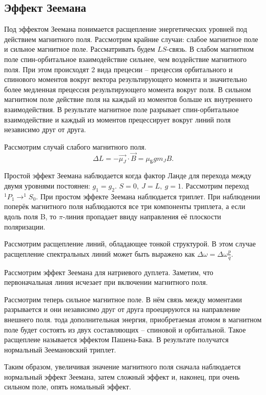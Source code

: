 \subsection{Эффект Зеемана}
Под эффектом Зеемана понимается расщепление энергетических уровней под действием магнитного поля. Рассмотрим крайние случаи: слабое магнитное поле и сильное магнитное поле. Рассматривать будем \( LS \)-связь. В слабом магнитном поле спин-орбитальное взаимодействие сильнее, чем воздействие магнитного поля. При этом происходят 2 вида прецесии -- прецессия орбитального и спинового моментов вокруг вектора результирующего момента и значительно более медленная прецессия результирующего момента вокруг поля.
В сильном магнитном поле действие поля на каждый из моментов больше их внутреннего взаимодействия. В результате магнитное поле разрывает спин-орбитальное взаимодействие и каждый из моментов прецессирует вокруг линий поля независимо друг от друга.

Рассмотрим случай слабого магнитного поля.
\[
    \Delta L = -\vec{\mu_J}\cdot\vec{B}  = \mu_\text{Б}gm_JB.
\]

Простой эффект Зеемана наблюдается когда фактор Ланде для перехода между двумя уровнями постоянен:
\( g_1 = g_2 \). \( S=0,\ J=L,\ g=1. \) Рассмотрим переход \( ^1P_1 \rightarrow ^1S_0 \). При простом эффекте Зеемана наблюдается триплет. При наблюдении поперёк магнитного поля наблюдаются все три компоненты триплета, а если вдоль поля B, то \( \pi \)-линия пропадает ввиду направления её плоскости поляризации.

Рассмотрим расщепление линий, обладающее тонкой структурой. В этом случае расщепление спектральных линий может быть выражено как \( \Delta \omega = \Delta \omega \frac{p}{q} \).

Рассмотрим эффект Зеемана для натриевого дуплета. Заметим, что первоначальная линия исчезает при включении магнитного поля.

Рассмотрим теперь сильное магнитное поле. В нём связь между моментами разрывается и они независимо друг от друга проецируются на направление внешнего поля. тода дополнительная энергия, приобретаемая атомом в магнитном поле будет состоять из двух составляющих -- спиновой и орбитальной. Такое расщеплеие называется эффектом Пашена-Бака. В результате получатся нормальный Зеемановский триплет.

Таким образом, увеличивая значение магнитного поля сначала наблюдается нормальный эффект Зеемана, затем сложный эффект и, наконец, при очень сильном поле, опять номальный эффект.


